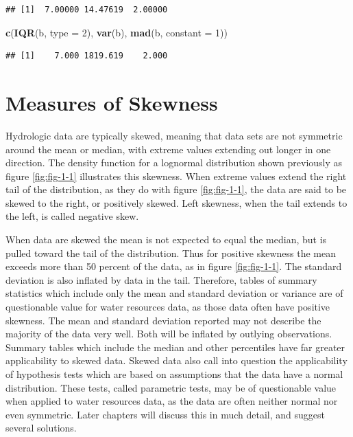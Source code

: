 \documentclass[]{book}
\newenvironment{Shaded}{\begin{snugshade}}{\end{snugshade}}
\newcommand{\DataTypeTok}[1]{\textcolor[rgb]{0.13,0.29,0.53}{#1}}
\newcommand{\DecValTok}[1]{\textcolor[rgb]{0.00,0.00,0.81}{#1}}
\newcommand{\KeywordTok}[1]{\textcolor[rgb]{0.13,0.29,0.53}{\textbf{#1}}}
\newcommand{\NormalTok}[1]{#1}
\begin{document}
\begin{verbatim}
## [1]  7.00000 14.47619  2.00000
\end{verbatim}

\begin{Shaded}
\begin{Highlighting}[]
\KeywordTok{c}\NormalTok{(}\KeywordTok{IQR}\NormalTok{(b, }\DataTypeTok{type =} \DecValTok{2}\NormalTok{), }\KeywordTok{var}\NormalTok{(b), }\KeywordTok{mad}\NormalTok{(b, }\DataTypeTok{constant =} \DecValTok{1}\NormalTok{))}
\end{Highlighting}
\end{Shaded}

\begin{verbatim}
## [1]    7.000 1819.619    2.000
\end{verbatim}

\hypertarget{measures-of-skewness}{%
\section{Measures of Skewness}\label{measures-of-skewness}}

Hydrologic data are typically skewed, meaning that data sets are not symmetric around the mean or median, with extreme values extending out longer in one direction. The density function for a lognormal distribution shown previously as figure \ref{fig:fig-1-1} illustrates this skewness. When extreme values extend the right tail of the distribution, as they do with figure \ref{fig:fig-1-1}, the data are said to be skewed to the right, or positively skewed. Left skewness, when the tail extends to the left, is called negative skew.

When data are skewed the mean is not expected to equal the median, but is pulled toward the tail of the distribution. Thus for positive skewness the mean exceeds more than 50 percent of the data, as in figure \ref{fig:fig-1-1}. The standard deviation is also inflated by data in the tail. Therefore, tables of summary statistics which include only the mean and standard deviation or variance are of questionable value for water resources data, as those data often have positive skewness. The mean and standard deviation reported may not describe the majority of the data very well. Both will be inflated by outlying observations. Summary tables which include the median and other percentiles have far greater applicability to skewed data. Skewed data also call into question the applicability of hypothesis tests which are based on assumptions that the data have a normal distribution. These tests, called parametric tests, may be of questionable value when applied to water resources data, as the data are often neither normal nor even symmetric. Later chapters will discuss this in much detail, and suggest several solutions.
\end{document}
